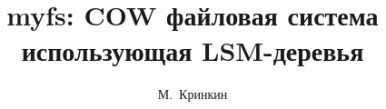 \documentclass[12pt,a4paper]{report}
\author{М.~Кринкин}
\title{myfs: COW файловая система использующая LSM-деревья}
\begin{document}
\sloppy
\onehalfspacing
\maketitle
\tableofcontents



{}

\end{document}
